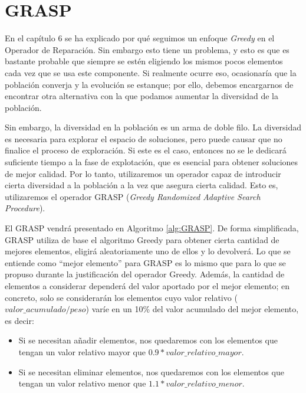 \section{GRASP}

En el capítulo 6 se ha explicado por qué seguimos un enfoque \textit{Greedy} en el Operador de Reparación. 
Sin embargo esto tiene un problema, y esto es que es bastante probable que siempre se estén eligiendo los mismos pocos elementos cada vez que se usa este componente. 
Si realmente ocurre eso, ocasionaría que la población converja y la evolución se estanque; por ello, debemos encargarnos de encontrar otra alternativa con la que podamos aumentar la diversidad de la población. 

Sin embargo, la diversidad en la población es un arma de doble filo. 
La diversidad es necesaria para explorar el espacio de soluciones, pero puede causar que no finalice el proceso de exploración. 
Si este es el caso, entonces no se le dedicará suficiente tiempo a la fase de explotación, que es esencial para obtener soluciones de mejor calidad. 
Por lo tanto, utilizaremos un operador capaz de introducir cierta diversidad a la población a la vez que asegura cierta calidad. 
Esto es, utilizaremos el operador GRASP (\textit{Greedy Randomized Adaptive Search Procedure}). 

El GRASP vendrá presentado en Algoritmo \ref{alg:GRASP}. 
De forma simplificada, GRASP utiliza de base el algoritmo Greedy para obtener cierta cantidad de mejores elementos, eligirá aleatoriamente uno de ellos y lo devolverá. 
Lo que se entiende como ``mejor elemento'' para GRASP es lo mismo que para lo que se propuso durante la justificación del operador Greedy. 
Además, la cantidad de elementos a considerar dependerá del valor aportado por el mejor elemento; en concreto, solo se considerarán los elementos cuyo valor relativo ($valor\_acumulado/peso$) varíe en un 10\% del valor acumulado del mejor elemento, es decir:
\begin{itemize}
	\item Si se necesitan añadir elementos, nos quedaremos con los elementos que tengan un valor relativo mayor que $0.9*valor\_relativo\_mayor$.
	\item Si se necesitan eliminar elementos, nos quedaremos con los elementos que tengan un valor relativo menor que $1.1*valor\_relativo\_menor$.
\end{itemize}

